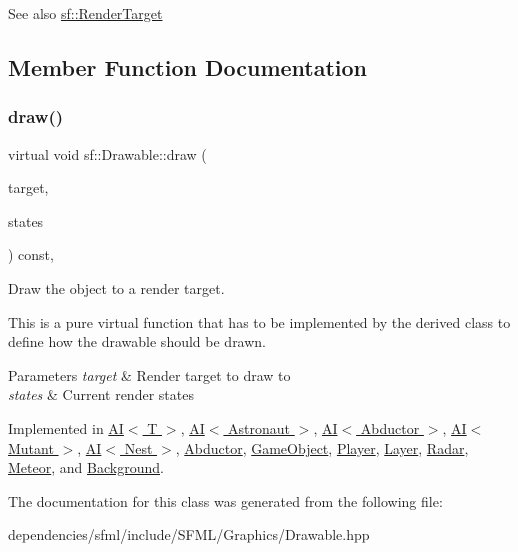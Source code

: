 \begin{DoxySeeAlso}{See also}
\hyperlink{classsf_1_1_render_target}{sf\+::\+Render\+Target} 
\end{DoxySeeAlso}


\subsection{Member Function Documentation}
\mbox{\label{classsf_1_1_drawable_a90d2c88bba9b035a0844eccb380ef631}} 
\subsubsection{\texorpdfstring{draw()}{draw()}}
{\footnotesize\ttfamily virtual void sf\+::\+Drawable\+::draw (\begin{DoxyParamCaption}\item[{\hyperlink{classsf_1_1_render_target}{Render\+Target} \&}]{target,  }\item[{\hyperlink{classsf_1_1_render_states}{Render\+States}}]{states }\end{DoxyParamCaption}) const\hspace{0.3cm}{\ttfamily [protected]}, {}}



Draw the object to a render target. 

This is a pure virtual function that has to be implemented by the derived class to define how the drawable should be drawn.


\begin{DoxyParams}{Parameters}
{\em target} & Render target to draw to \\
\hline
{\em states} & Current render states \\
\hline
\end{DoxyParams}


Implemented in \hyperlink{class_a_i_a8a7423a8612cfd777f3b5eeae4764d50}{A\+I$<$ T $>$}, \hyperlink{class_a_i_a8a7423a8612cfd777f3b5eeae4764d50}{A\+I$<$ Astronaut $>$}, \hyperlink{class_a_i_a8a7423a8612cfd777f3b5eeae4764d50}{A\+I$<$ Abductor $>$}, \hyperlink{class_a_i_a8a7423a8612cfd777f3b5eeae4764d50}{A\+I$<$ Mutant $>$}, \hyperlink{class_a_i_a8a7423a8612cfd777f3b5eeae4764d50}{A\+I$<$ Nest $>$}, \hyperlink{class_abductor_aebaf5c5a2882f41c8e1ed1b18f80e3d1}{Abductor}, \hyperlink{class_game_object_aa6d7650a920e2dd79b0125560faf3807}{Game\+Object}, \hyperlink{class_player_a0ca934f76860c378cd991a8a32f27edd}{Player}, \hyperlink{class_layer_adffe5112f908beaf0371894287d5870c}{Layer}, \hyperlink{class_radar_a89658480ff0e15b096097f8b7965893b}{Radar}, \hyperlink{class_meteor_a7fdbe8bd5027df6ae82e0d6391ec2b8d}{Meteor}, and \hyperlink{class_background_a607c05c3678be2dee50c736a11e21a50}{Background}.



The documentation for this class was generated from the following file\+:\begin{DoxyCompactItemize}
\item 
dependencies/sfml/include/\+S\+F\+M\+L/\+Graphics/Drawable.\+hpp\end{DoxyCompactItemize}
